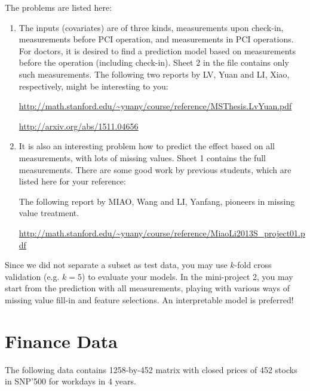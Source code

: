 \documentclass[11pt]{article}
\begin{document}
The problems are listed here:
\begin{enumerate}
\item The inputs (covariates) are of three kinds, measurements upon check-in, measurements before PCI operation, and measurements in PCI operations. For doctors, it is desired to find a prediction model based on measurements before the operation (including check-in). Sheet 2 in the file contains only such measurements.
\subitem The following two reports by LV, Yuan and LI, Xiao, respectively, might be interesting to you:

\url{http://math.stanford.edu/~yuany/course/reference/MSThesis.LvYuan.pdf} 

\url{http://arxiv.org/abs/1511.04656} 

\item It is also an interesting problem how to predict the effect based on all measurements, with lots of missing values. Sheet 1 contains the full measurements. There are some good work by previous students, which are listed here for your reference: 
%
%

\subitem The following report by MIAO, Wang and LI, Yanfang, pioneers in missing value treatment. 

\url{http://math.stanford.edu/~yuany/course/reference/MiaoLi2013S_project01.pdf}

\end{enumerate} 

Since we did not separate a subset as test data, you may use $k$-fold cross validation (e.g. $k=5$) to evaluate your models. In the mini-project 2, you may start from the prediction with all measurements, playing with various ways of missing value fill-in and feature selections. An interpretable model is preferred!



\section{Finance Data}
The following data contains 1258-by-452 matrix with closed prices of 452 stocks in SNP'500 for workdays in 4 years.
\end{document}

